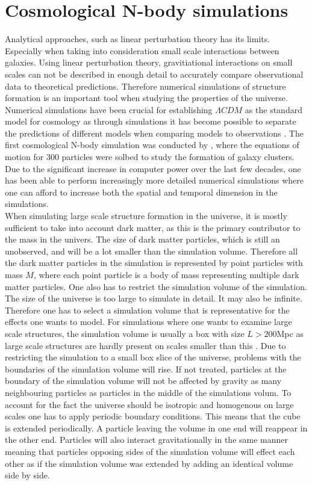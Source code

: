 \section{Cosmological N-body simulations}
Analytical approaches, such as linear perturbation theory has its limits.
Especially when taking into consideration small scale interactions between
galaxies. Using linear perturbation theory, gravitiational interactions on small scales can not be described in
enough detail to accurately compare observational data to theoretical
predictions. Therefore numerical simulations of structure formation is an
important tool when studying the properties of the universe. Numerical
simulations have been crucial for establishing $\Lambda CDM$ as the standard
model for cosmology as through simulations it has become possible to separate
the predictions of different models when comparing models to observations
\cite[p.~361]{schneider2006extragalactic}. The first cosmological N-body
simulation was conducted by \cite{PeeblesPJE1970SotC}, where the equations of
motion for $300$ particles were solbed to study the formation of galaxy clusters. Due to the significant increase in
computer power over the last few decades, one has been able to perform
increasingly more detailed numerical simulations where one can afford to
increase both the spatial and temporal dimension in the simulations.\\

When simulating large scale structure formation in the universe, it is mostly
sufficient to take into account dark matter, as this is the primary contributor
to the mass in the univers. The size of dark matter particles, which is still an
unobserved, and will be a lot smaller than the simulation volume. Therefore
all the dark matter particles in the simulation is represented by point
particles with mass $M$, where each point particle is a body of mass
representing multiple dark matter particles. One also has to restrict the
simulation volume of the simulation. The size of the universe is too large to
simulate in detail. It may also be infinite. Therefore one has to select a
simulation volume that is representative for the effects one wants to model. For
simulations where one wants to examine large scale structures, the simulation
volume is usually a box with size $L>200$Mpc as large scale structures are hardly present on
scales smaller than this \cite[p.~362]{schneider2006extragalactic}. Due to
restricting the simulation to a small box slice of the universe, problems with
the boundaries of the simulation volume will rise. If not treated, particles at
the boundary of the simulation volume will not be affected by gravity as many
neighbouring particles as particles in the middle of the simulations volum. To
account for the fact the universe should be isotropic and homogenous on large
scales one has to apply periodic boundary conditions. This means that the cube
is extended periodically. A particle leaving the volume in one end will reappear
in the other end. Particles will also interact gravitationally in the same
manner meaning that particles opposing sides of the simulation volume will
effect each other as if the simulation volume was extended by adding an
identical volume side by side.


